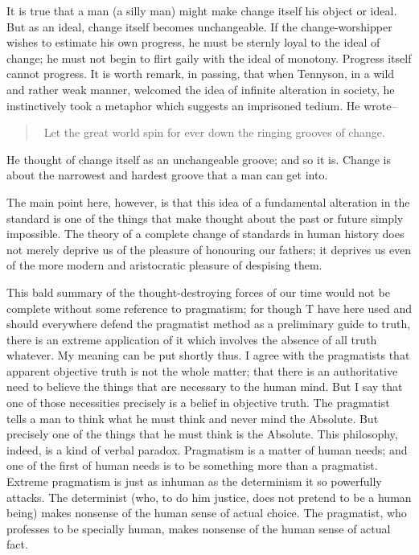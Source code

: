 \documentclass{book}
\begin{document}
It is true that a man (a silly man) might make change itself his object or ideal. But as an ideal, change itself becomes unchangeable. If the change-worshipper wishes to estimate his own progress, he must be sternly loyal to the ideal of change; he must not begin to flirt gaily with the ideal of monotony. Progress itself cannot progress. It is worth remark, in passing, that when Tennyson, in a wild and rather weak manner, welcomed the idea of infinite alteration in society, he instinctively took a metaphor which suggests an imprisoned tedium. He wrote–

\begin{quotation}\
	Let the great world spin for ever down the ringing grooves of change.
\end{quotation}

He thought of change itself as an unchangeable groove; and so it is. Change is about the narrowest and hardest groove that a man can get into.

The main point here, however, is that this idea of a fundamental alteration in the standard is one of the things that make thought about the past or future simply impossible. The theory of a complete change of standards in human history does not merely deprive us of the pleasure of honouring our fathers; it deprives us even of the more modern and aristocratic pleasure of despising them.

This bald summary of the thought-destroying forces of our time would not be complete without some reference to pragmatism; for though T have here used and should everywhere defend the pragmatist method as a preliminary guide to truth, there is an extreme application of it which involves the absence of all truth whatever. My meaning can be put shortly thus. I agree with the pragmatists that apparent objective truth is not the whole matter; that there is an authoritative need to believe the things that are necessary to the human mind. But I say that one of those necessities precisely is a belief in objective truth. The pragmatist tells a man to think what he must think and never mind the Absolute. But precisely one of the things that he must think is the Absolute. This philosophy, indeed, is a kind of verbal paradox. Pragmatism is a matter of human needs; and one of the first of human needs is to be something more than a pragmatist. Extreme pragmatism is just as inhuman as the determinism it so powerfully attacks. The determinist (who, to do him justice, does not pretend to be a human being) makes nonsense of the human sense of actual choice. The pragmatist, who professes to be specially human, makes nonsense of the human sense of actual fact.
\end{document}
